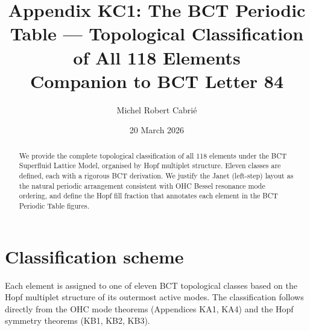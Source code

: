 \documentclass[aps,prl,onecolumn,superscriptaddress]{revtex4-2}
\begin{document}
\title{Appendix KC1: The BCT Periodic Table ---
Topological Classification of All 118 Elements\\
\normalsize Companion to BCT Letter 84}

\author{Michel Robert Cabri\'{e}}

\date{20 March 2026}

\begin{abstract}
We provide the complete topological classification of all 118 elements
under the BCT Superfluid Lattice Model, organised by Hopf multiplet
structure. Eleven classes are defined, each with a rigorous BCT
derivation. We justify the Janet (left-step) layout as the natural
periodic arrangement consistent with OHC Bessel resonance mode ordering,
and define the Hopf fill fraction that annotates each element in the
BCT Periodic Table figures.
\end{abstract}

\maketitle

\section{Classification scheme}

Each element is assigned to one of eleven BCT topological classes
based on the Hopf multiplet structure of its outermost active modes.
The classification follows directly from the OHC mode theorems
(Appendices KA1, KA4) and the Hopf symmetry theorems (KB1, KB2, KB3).
\end{document}
